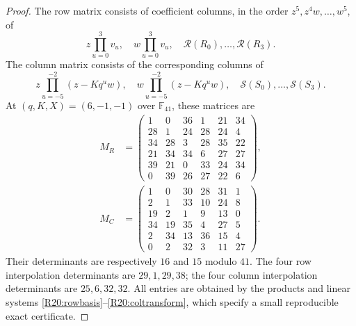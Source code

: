\begin{proof}
The row matrix consists of coefficient columns, in the order
$z^5,z^4w,\ldots,w^5$, of
\[
 z\prod_{u=0}^3v_u,\quad w\prod_{u=0}^3v_u,
 \quad\mathcal R(R_0),\ldots,\mathcal R(R_3).
\]
The column matrix consists of the corresponding columns of
\[
 z\prod_{u=-5}^{-2}(z-Kq^uw),\quad
 w\prod_{u=-5}^{-2}(z-Kq^uw),
 \quad\mathcal S(S_0),\ldots,\mathcal S(S_3).
\]
At $(q,K,X)=(6,-1,-1)$ over $\mathbb F_{41}$, these matrices are
\begin{equation}\label{R20:matrices}
 \begin{split}
 M_R&=\begin{pmatrix}
 1&0&36&1&21&34\\28&1&24&28&24&4\\
 34&28&3&28&35&22\\21&34&34&6&27&27\\
 39&21&0&33&24&34\\0&39&26&27&22&6
 \end{pmatrix},\\
 M_C&=\begin{pmatrix}
 1&0&30&28&31&1\\2&1&33&10&24&8\\
 19&2&1&9&13&0\\34&19&35&4&27&5\\
 2&34&13&36&15&4\\0&2&32&3&11&27
 \end{pmatrix}.
 \end{split}
\end{equation}
Their determinants are respectively $16$ and $15$ modulo $41$.
The four row interpolation determinants are $29,1,29,38$;
the four column interpolation determinants are $25,6,32,32$.
All entries are obtained by the products and linear systems
\eqref{R20:rowbasis}--\eqref{R20:coltransform}, which specify a
small reproducible exact certificate.


\end{proof}
